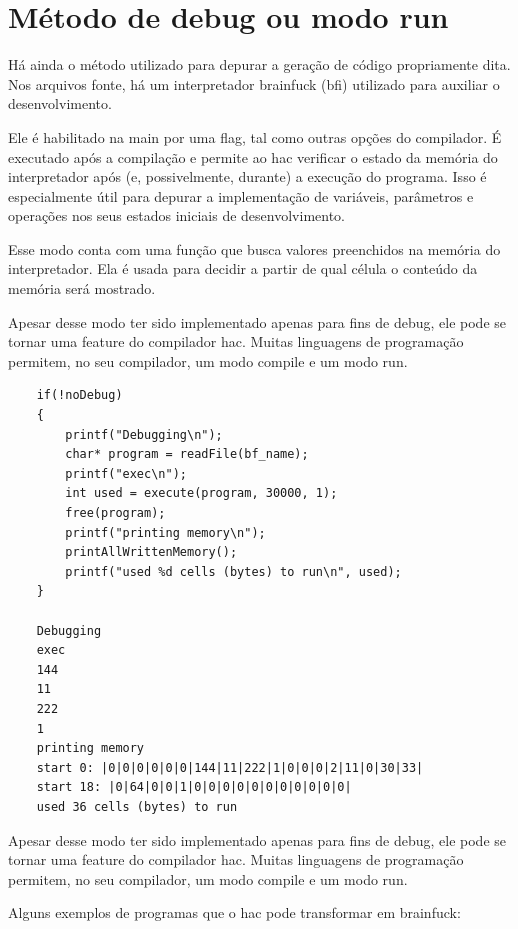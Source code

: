 \section{Método de debug ou modo run}

Há ainda o método utilizado para depurar a geração de código propriamente dita. Nos arquivos fonte, há um interpretador brainfuck (bfi) utilizado para auxiliar o desenvolvimento. 

Ele é habilitado na main por uma flag, tal como outras opções do compilador. É executado após a compilação e permite ao hac verificar o estado da memória do interpretador após (e, possivelmente, durante) a execução do programa. Isso é especialmente útil para depurar a implementação de variáveis, parâmetros e operações nos seus estados iniciais de desenvolvimento.

Esse modo conta com uma função que busca valores preenchidos na memória do interpretador. Ela é usada para decidir a partir de qual célula o conteúdo da memória será mostrado. 

Apesar desse modo ter sido implementado apenas para fins de debug, ele pode se tornar uma feature do compilador hac. Muitas linguagens de programação permitem, no seu compilador, um modo compile e um modo run.

\begin{verbatim}
    if(!noDebug)
    {
        printf("Debugging\n");
        char* program = readFile(bf_name);
        printf("exec\n");
        int used = execute(program, 30000, 1);
        free(program);
        printf("printing memory\n");
        printAllWrittenMemory();
        printf("used %d cells (bytes) to run\n", used);
    }
    
    Debugging
    exec
    144
    11
    222
    1
    printing memory
    start 0: |0|0|0|0|0|0|144|11|222|1|0|0|0|2|11|0|30|33|
    start 18: |0|64|0|0|1|0|0|0|0|0|0|0|0|0|0|0|
    used 36 cells (bytes) to run
\end{verbatim}

Apesar desse modo ter sido implementado apenas para fins de debug, ele pode se tornar uma feature do compilador hac. Muitas linguagens de programação permitem, no seu compilador, um modo compile e um modo run.

Alguns exemplos de programas que o hac pode transformar em brainfuck:


